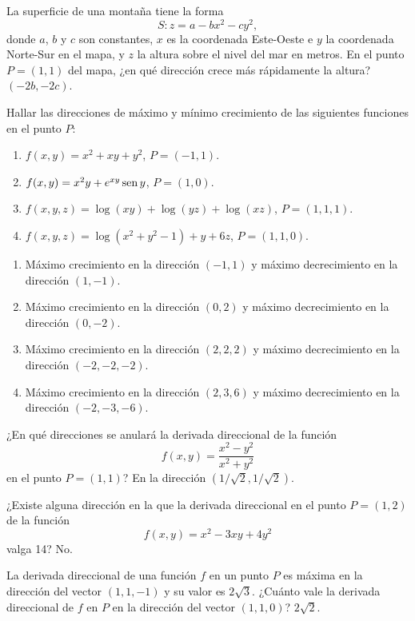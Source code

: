 {La superficie de una montaña tiene la forma
\[
S:z=a-bx^2-cy^2,
\]
donde $a$, $b$ y $c$ son constantes, $x$ es la coordenada Este-Oeste e $y$ la coordenada Norte-Sur en el mapa, y $z$ la altura sobre el nivel del mar en metros.
En el punto $P=(1,1)$ del mapa, ¿en qué dirección crece más rápidamente la altura?
}
{$(-2b,-2c)$.
}
{
}


{Hallar las direcciones de máximo y mínimo crecimiento de las siguientes funciones en el punto $P$:
\begin{enumerate}
\item $f(x,y)=x^2+xy+y^2$, $P=(-1,1)$.
\item $f(x,y)=x^2y+e^{xy}\operatorname{sen} y$, $P=(1,0)$.
\item $f(x,y,z)=\log(xy)+\log(yz)+\log(xz)$, $P=(1,1,1)$.
\item $f(x,y,z)=\log(x^2+y^2-1)+y+6z$, $P=(1,1,0)$.
\end{enumerate}
}
{\begin{enumerate}
\item Máximo crecimiento en la dirección $(-1,1)$ y máximo decrecimiento en la dirección $(1,-1)$.
\item Máximo crecimiento en la dirección $(0,2)$ y máximo decrecimiento en la dirección $(0,-2)$.
\item Máximo crecimiento en la dirección $(2,2,2)$ y máximo decrecimiento en la dirección $(-2,-2,-2)$.
\item Máximo crecimiento en la dirección $(2,3,6)$ y máximo decrecimiento en la dirección $(-2,-3,-6)$.
\end{enumerate}
}
{
}


{¿En qué direcciones se anulará la derivada direccional de la función
\[
f(x,y)=\frac{x^2-y^2}{x^2+y^2}
\]
en el punto $P=(1,1)$?
}
{En la dirección $(1/\sqrt{2},1/\sqrt{2})$.
}
{
}


{¿Existe alguna dirección en la que la derivada direccional en el punto $P=(1,2)$ de la función
\[
f(x,y) = x^2-3xy+4y^2
\]
valga 14?
}
{No.
}
{
}


{La derivada direccional de una función $f$ en un punto $P$ es máxima en la dirección del vector $(1,1,-1)$ y su valor es $2\sqrt{3}$.
¿Cuánto vale la derivada direccional de $f$ en $P$ en la dirección del vector $(1,1,0)$?
}
{$2\sqrt{2}$.
}
{
}


